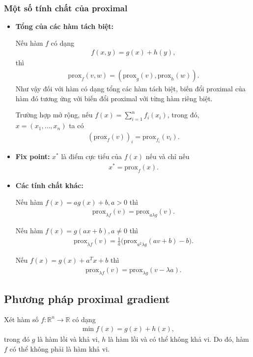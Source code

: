 \documentclass{book}
\begin{document}
\subsubsection{Một số tính chất của proximal}

\begin{itemize}

\item \textbf{Tổng của các hàm tách biệt:}
 
Nếu hàm $f$ có dạng 
\begin{align*}
f(x,y) = g(x) + h(y),
\end{align*}
thì 
\begin{align*}
\textrm{prox}_f (v,w) = (\textrm{prox}_g(v), \textrm{prox}_h(w)).
\end{align*}
Như vậy đối với hàm có dạng tổng các hàm tách biệt, biến đổi proximal của hàm đó tương ứng với biến đổi proximal với từng hàm riêng biệt.

Trường hợp mở rộng, nếu $f(x) = \sum_{i=1}^n f_i(x_i)$, trong đó, $x = (x_1,\ldots,x_n)$ ta có 
\begin{align*}
(\textrm{prox}_f (v))_i = \textrm{prox}_{f_i}(v_i).
\end{align*}

\item \textbf{Fix point:}
$x^*$ là điểm cực tiểu của $f(x)$ nếu và chỉ nếu
\begin{align*}
x^* = \textrm{prox}_f(x).
\end{align*}

\item \textbf{Các tính chất khác:}

\noindent Nếu hàm $f(x) = a g(x) + b, a>0$ thì
\begin{align*}
\textrm{prox}_{\lambda f} (v) = \textrm{prox}_{a \lambda g}(v).
\end{align*}

\noindent Nếu hàm $f(x) = g(ax + b), a \neq 0$ thì 
\begin{align*}
\textrm{prox}_{\lambda f} (v) = \frac{1}{a} \big(\textrm{prox}_{a^2 \lambda g}(av + b) - b\big).
\end{align*}

\noindent Nếu $f(x) = g(x) + a^Tx + b$ thì
\begin{align*}
\textrm{prox}_{\lambda f} (v) = \textrm{prox}_{\lambda g}(v - \lambda a).
\end{align*}
\end{itemize}

\subsection{Phương pháp proximal gradient}
Xét hàm số $f: \mathbb{R}^n \rightarrow \mathbb{R}$ có dạng
\begin{align*}
\min f(x) = g(x) + h(x),
\end{align*} 
trong đó $g$ là hàm lồi và khả vi, $h$ là hàm lồi và có thể không khả vi. 
Do đó, hàm $f$ có thể không phải là hàm khả vi.
\end{document}
